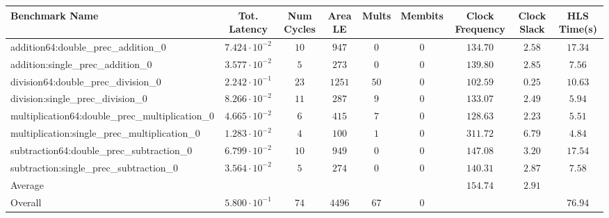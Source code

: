 \begin{tabular}{|l|c|c|c|c|c|c|c|c|}
\hline
Benchmark Name                                   & Tot. Latency            & Num Cycles & Area LE  & Mults  & Membits & Clock Frequency & Clock Slack & HLS Time(s) \\
\hline
addition64:double\_prec\_addition\_0             & $ 7.424 \cdot 10^{-2} $ & $ 10     $ & $ 947  $ & $ 0  $ & $ 0   $ & $ 134.70      $ & $ 2.58    $ & $ 17.34   $ \\
addition:single\_prec\_addition\_0               & $ 3.577 \cdot 10^{-2} $ & $ 5      $ & $ 273  $ & $ 0  $ & $ 0   $ & $ 139.80      $ & $ 2.85    $ & $ 7.56    $ \\
division64:double\_prec\_division\_0             & $ 2.242 \cdot 10^{-1} $ & $ 23     $ & $ 1251 $ & $ 50 $ & $ 0   $ & $ 102.59      $ & $ 0.25    $ & $ 10.63   $ \\
division:single\_prec\_division\_0               & $ 8.266 \cdot 10^{-2} $ & $ 11     $ & $ 287  $ & $ 9  $ & $ 0   $ & $ 133.07      $ & $ 2.49    $ & $ 5.94    $ \\
multiplication64:double\_prec\_multiplication\_0 & $ 4.665 \cdot 10^{-2} $ & $ 6      $ & $ 415  $ & $ 7  $ & $ 0   $ & $ 128.63      $ & $ 2.23    $ & $ 5.51    $ \\
multiplication:single\_prec\_multiplication\_0   & $ 1.283 \cdot 10^{-2} $ & $ 4      $ & $ 100  $ & $ 1  $ & $ 0   $ & $ 311.72      $ & $ 6.79    $ & $ 4.84    $ \\
subtraction64:double\_prec\_subtraction\_0       & $ 6.799 \cdot 10^{-2} $ & $ 10     $ & $ 949  $ & $ 0  $ & $ 0   $ & $ 147.08      $ & $ 3.20    $ & $ 17.54   $ \\
subtraction:single\_prec\_subtraction\_0         & $ 3.564 \cdot 10^{-2} $ & $ 5      $ & $ 274  $ & $ 0  $ & $ 0   $ & $ 140.31      $ & $ 2.87    $ & $ 7.58    $ \\
\hline
Average                                          & $                     $ & $        $ & $      $ & $    $ & $     $ & $ 154.74      $ & $ 2.91    $ & $         $ \\
\hline
Overall                                          & $ 5.800 \cdot 10^{-1} $ & $ 74     $ & $ 4496 $ & $ 67 $ & $ 0   $ & $             $ & $         $ & $ 76.94   $ \\
\hline
\end{tabular}
